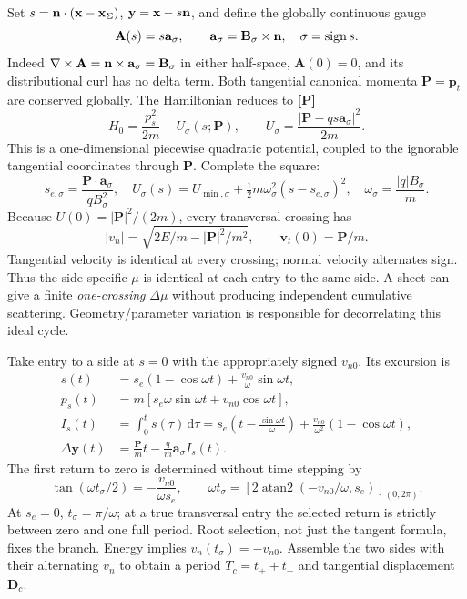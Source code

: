 \documentclass[10pt,a4paper]{article}
\newcommand{\B}{\mathbf B}\newcommand{\bunit}{\mathbf b}
\newcommand{\y}{\mathbf y}\newcommand{\x}{\mathbf x}\renewcommand{\v}{\mathbf v}\newcommand{\p}{\mathbf p}
\newcommand{\A}{\mathbf A}\newcommand{\dd}{\mathrm d}
\newcommand{\proved}{\textbf{[P]}}
\begin{document}
Set $s=\n\cdot(\x-\x_\Sigma)$, $\y=\x-s\n$, and define the globally continuous gauge
\begin{equation}\label{eq:sheetgauge}
 \A(s)=s\mathbf a_\sigma,\qquad
 \mathbf a_\sigma=\B_\sigma\times\n,
 \quad\sigma=\operatorname{sign}s.
\end{equation}
Indeed $\nabla\times\A=\n\times\mathbf a_\sigma=\B_\sigma$ in either half-space, $\A(0)=0$, and its distributional curl has no delta term. Both tangential canonical momenta $\mathbf P=\p_t$ are conserved globally. The Hamiltonian reduces to \proved{}
\begin{equation}\label{eq:normalH}
 H_0=\frac{p_s^2}{2m}+U_\sigma(s;\mathbf P),\qquad
 U_\sigma=\frac{|\mathbf P-q s\mathbf a_\sigma|^2}{2m}.
\end{equation}
This is a one-dimensional piecewise quadratic potential, coupled to the ignorable tangential coordinates through $\mathbf P$. Complete the square:
\begin{equation}\label{eq:normalosc}
 s_{e,\sigma}=\frac{\mathbf P\cdot\mathbf a_\sigma}{q B_\sigma^2},\quad
 U_\sigma(s)=U_{\min,\sigma}
 +\tfrac12m\omega_\sigma^2(s-s_{e,\sigma})^2,\quad
 \omega_\sigma=\frac{|q|B_\sigma}{m}.
\end{equation}
Because $U(0)=|\mathbf P|^2/(2m)$, every transversal crossing has
\begin{equation}
 |v_n|=\sqrt{2E/m-|\mathbf P|^2/m^2},\qquad
 \v_t(0)=\mathbf P/m.
\end{equation}
Tangential velocity is identical at every crossing; normal velocity alternates sign. Thus the side-specific $\mu$ is identical at each entry to the same side. A sheet can give a finite \emph{one-crossing} $\Delta\mu$ without producing independent cumulative scattering. Geometry/parameter variation is responsible for decorrelating this ideal cycle.

Take entry to a side at $s=0$ with the appropriately signed $v_{n0}$. Its excursion is
\begin{align}\label{eq:excursion}
 s(t)&=s_e(1-\cos\omega t)+\frac{v_{n0}}\omega\sin\omega t,\\
 p_s(t)&=m\left[s_e\omega\sin\omega t+v_{n0}\cos\omega t\right],\\
 I_s(t)&=\int_0^t s(\tau)\,\dd\tau
 =s_e\left(t-\frac{\sin\omega t}{\omega}\right)
    +\frac{v_{n0}}{\omega^2}(1-\cos\omega t),\\
 \Delta\y(t)&=\frac{\mathbf P}{m}t-\frac q m\mathbf a_\sigma I_s(t).
\end{align}
The first return to zero is determined without time stepping by
\begin{equation}\label{eq:returntime}
 \tan(\omega t_\sigma/2)=-\frac{v_{n0}}{\omega s_e},\qquad
 \omega t_\sigma=\left[2\operatorname{atan2}(-v_{n0}/\omega,s_e)\right]_{(0,2\pi)}.
\end{equation}
At $s_e=0$, $t_\sigma=\pi/\omega$; at a true transversal entry the selected return is strictly between zero and one full period. Root selection, not just the tangent formula, fixes the branch. Energy implies $v_n(t_\sigma)=-v_{n0}$. Assemble the two sides with their alternating $v_n$ to obtain a period $T_c=t_++t_-$ and tangential displacement $\mathbf D_c$.
\end{document}
